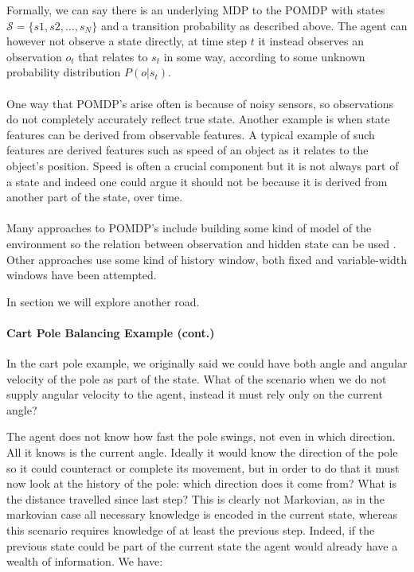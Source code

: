 Formally, we can say there is an underlying MDP to the POMDP
with states $\mathcal{S} = \{s1, s2,\dots,s_N\}$
and a transition probability as described above.
The agent can however not observe a state directly,
at time step $t$ it instead observes an observation $o_t$
that relates to $s_t$ in some way,
according to some unknown probability distribution $P(o|s_t)$.

\paragraph{}
One way that POMDP's arise often is because of noisy sensors,
so observations do not completely accurately reflect true state.
Another example is when state features can be derived
from observable features.
A typical example of such features are derived features
such as speed of an object as it relates to the object's position.
Speed is often a crucial component but it is not always
part of a state and indeed one could argue it should not be
because it is derived from another part of the state, over time.

\paragraph{}
Many approaches to POMDP's
include building some kind of model of the environment
so the relation between observation and hidden state can be used
\parencite{Cassandra1994}.
Other approaches use some kind of history window,
both fixed
\parencite{mccallum1995instance}
and variable-width windows
\parencite{ring1994continual}
have been attempted.

In section %
we will explore another road.

\paragraph{Cart Pole Balancing Example (cont.)}
In the cart pole example, we originally said we could have both angle
and angular velocity of the pole as part of the state.
What of the scenario when we do not supply angular velocity to the agent,
instead it must rely only on the current angle?

The agent does not know how fast the pole swings,
not even in which direction.
All it knows is the current angle.
Ideally it would know the direction of the pole
so it could counteract or complete its movement,
but in order to do that it must now look at the history
of the pole: which direction does it come from?
What is the distance travelled since last step?
This is clearly not Markovian,
as in the markovian case all necessary knowledge
is encoded in the current state,
whereas this scenario requires knowledge of at least the previous step.
Indeed, if the previous state could be part of the current state
the agent would already have a wealth of information.
We have:

